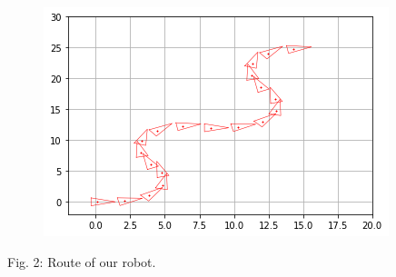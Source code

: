 \documentclass[11pt]{article}
\begin{document}
\begin{figure}
\centering
\includegraphics{images/fig3-2-1.png}
\end{figure}
Fig. 2: Route of our robot.
\end{document}
